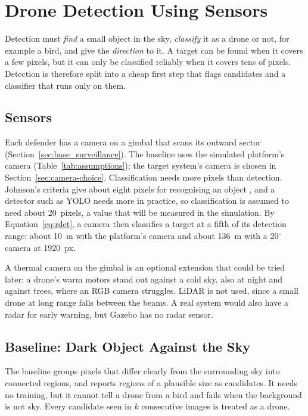\newpage
\section{Drone Detection Using Sensors}
\label{sec:detection}
Detection must \emph{find} a small object in the sky, \emph{classify} it as
a drone or not, for example a bird, and give the \emph{direction} to it. A
target can be found when it covers a few pixels, but it can only be
classified reliably when it covers tens of pixels. Detection is therefore
split into a cheap first step that flags candidates and a classifier that
runs only on them.

\subsection{Sensors}
Each defender has a camera on a gimbal that scans its outward sector
(Section~\ref{sec:base_surveillance}). The baseline uses the simulated
platform's camera (Table~\ref{tab:assumptions}); the target system's camera
is chosen in Section~\ref{sec:camera-choice}.
Classification needs more pixels than detection. Johnson's criteria give
about eight pixels for recognising an object \cite{johnson1958analysis},
and a detector such as YOLO needs more in practice, so classification is
assumed to need about 20~pixels, a value that will be measured in the
simulation. By
Equation~\eqref{eq:rdet}, a camera then classifies a target at a fifth of
its detection range: about 10~m with the platform's camera and about
136~m with a 20$^\circ$ camera at 1920~px.

A thermal camera on the gimbal is an optional extension that could be tried
later: a drone's warm motors stand out against a cold sky, also at night
and against trees, where an RGB camera struggles. LiDAR is not used, since
a small drone at long range falls between the beams. A real system would
also have a radar for early warning, but Gazebo has no radar sensor.

\subsection{Baseline: Dark Object Against the Sky}
The baseline groups pixels that differ clearly from the surrounding sky
into connected regions, and reports regions of a plausible size as
candidates. It needs no training, but it cannot tell a drone from a bird
and fails when the background is not sky. Every candidate seen in $k$
consecutive images is treated as a drone.

